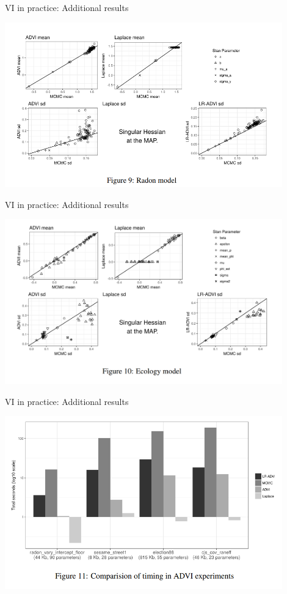 \begin{frame}{VI in practice: Additional results}

\begin{center}
\includegraphics[width=0.9\textwidth]{static_images/Radon_model.png}
\end{center}

\end{frame}



\begin{frame}{VI in practice: Additional results}

\begin{center}
\includegraphics[width=0.9\textwidth]{static_images/CJS_model.png}
\end{center}

\end{frame}




\begin{frame}{VI in practice: Additional results}

\begin{center}
\includegraphics[width=0.9\textwidth]{static_images/advi_timing.png}
\end{center}

\end{frame}
